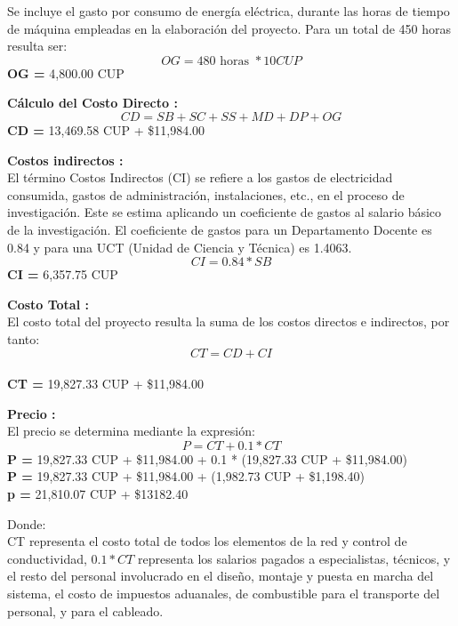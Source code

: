 Se incluye el gasto por consumo de energía eléctrica, durante las horas de tiempo de máquina empleadas
en la elaboración del proyecto. Para un total de 450 horas resulta ser:
\begin{equation}
    OG = 480 \text{ horas } * 10 CUP
\end{equation}
\textbf{OG =} 4,800.00 CUP

\textbf{Cálculo del Costo Directo :}\\
\begin{equation}
    CD = SB + SC + SS + MD + DP + OG
\end{equation}
\textbf{CD =} 13,469.58 CUP + \$11,984.00

\textbf{Costos indirectos :}\\
El término Costos Indirectos (CI) se refiere a los gastos de electricidad consumida, gastos de administración,
instalaciones, etc., en el proceso de investigación. Este se estima aplicando un coeficiente de gastos al
salario básico de la investigación. El coeficiente de gastos para un Departamento Docente es 0.84 y para una
UCT (Unidad de Ciencia y Técnica) es 1.4063.
\begin{equation}
    CI = 0.84 * SB
\end{equation}
\textbf{CI =} 6,357.75 CUP

\textbf{Costo Total :}\\
El costo total del proyecto resulta la suma de los costos directos e indirectos, por tanto:
\begin{equation}
    CT = CD + CI
\end{equation}\\
\textbf{CT =} 19,827.33 CUP + \$11,984.00

\textbf{Precio :}\\
El precio se determina mediante la expresión:
\begin{equation}
    P = CT + 0.1 * CT
\end{equation}
\textbf{P =} 19,827.33 CUP + \$11,984.00 + 0.1 * (19,827.33 CUP + \$11,984.00)\\
\textbf{P =} 19,827.33 CUP + \$11,984.00 +  (1,982.73 CUP + \$1,198.40)\\
\textbf{p =} 21,810.07 CUP + \$13182.40

Donde:\\
CT representa el costo total de todos los elementos de la red y control de conductividad, $0.1*CT$
representa los salarios pagados a especialistas, técnicos, y el resto del personal involucrado en el diseño,
montaje y puesta en marcha del sistema, el costo de impuestos aduanales, de combustible para el transporte del
personal, y para el cableado.

